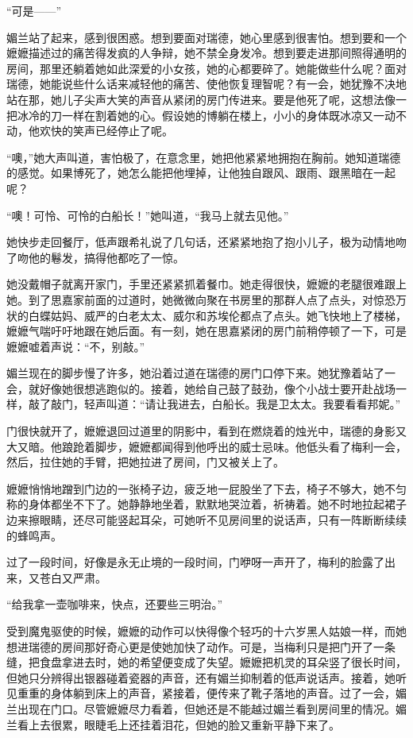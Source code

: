 \par “可是——”
\par 媚兰站了起来，感到很困惑。想到要面对瑞德，她心里感到很害怕。想到要和一个嬷嬷描述过的痛苦得发疯的人争辩，她不禁全身发冷。想到要走进那间照得通明的房间，那里还躺着她如此深爱的小女孩，她的心都要碎了。她能做些什么呢？面对瑞德，她能说些什么话来减轻他的痛苦、使他恢复理智呢？有一会，她犹豫不决地站在那，她儿子尖声大笑的声音从紧闭的房门传进来。要是他死了呢，这想法像一把冰冷的刀一样在割着她的心。假设她的博躺在楼上，小小的身体既冰凉又一动不动，他欢快的笑声已经停止了呢。
\par “噢，”她大声叫道，害怕极了，在意念里，她把他紧紧地拥抱在胸前。她知道瑞德的感觉。如果博死了，她怎么能把他埋掉，让他独自跟风、跟雨、跟黑暗在一起呢？
\par “噢！可怜、可怜的白船长！”她叫道，“我马上就去见他。”
\par 她快步走回餐厅，低声跟希礼说了几句话，还紧紧地抱了抱小儿子，极为动情地吻了吻他的鬈发，搞得他都吃了一惊。
\par 她没戴帽子就离开家门，手里还紧紧抓着餐巾。她走得很快，嬷嬷的老腿很难跟上她。到了思嘉家前面的过道时，她微微向聚在书房里的那群人点了点头，对惊恐万状的白蝶姑妈、威严的白老太太、威尔和苏埃伦都点了点头。她飞快地上了楼梯，嬷嬷气喘吁吁地跟在她后面。有一刻，她在思嘉紧闭的房门前稍停顿了一下，可是嬷嬷嘘着声说：“不，别敲。”
\par 媚兰现在的脚步慢了许多，她沿着过道在瑞德的房门口停下来。她犹豫着站了一会，就好像她很想逃跑似的。接着，她给自己鼓了鼓劲，像个小战士要开赴战场一样，敲了敲门，轻声叫道：“请让我进去，白船长。我是卫太太。我要看看邦妮。”
\par 门很快就开了，嬷嬷退回过道里的阴影中，看到在燃烧着的烛光中，瑞德的身影又大又暗。他踉跄着脚步，嬷嬷都闻得到他呼出的威士忌味。他低头看了梅利一会，然后，拉住她的手臂，把她拉进了房间，门又被关上了。
\par 嬷嬷悄悄地蹭到门边的一张椅子边，疲乏地一屁股坐了下去，椅子不够大，她不匀称的身体都坐不下了。她静静地坐着，默默地哭泣着，祈祷着。她不时地拉起裙子边来擦眼睛，还尽可能竖起耳朵，可她听不见房间里的说话声，只有一阵断断续续的蜂鸣声。
\par 过了一段时间，好像是永无止境的一段时间，门咿呀一声开了，梅利的脸露了出来，又苍白又严肃。
\par “给我拿一壶咖啡来，快点，还要些三明治。”
\par 受到魔鬼驱使的时候，嬷嬷的动作可以快得像个轻巧的十六岁黑人姑娘一样，而她想进瑞德的房间那好奇心更是使她加快了动作。可是，当梅利只是把门开了一条缝，把食盘拿进去时，她的希望便变成了失望。嬷嬷把机灵的耳朵竖了很长时间，但她只分辨得出银器碰着瓷器的声音，还有媚兰抑制着的低声说话声。接着，她听见重重的身体躺到床上的声音，紧接着，便传来了靴子落地的声音。过了一会，媚兰出现在门口。尽管嬷嬷尽力看着，但她还是不能越过媚兰看到房间里的情况。媚兰看上去很累，眼睫毛上还挂着泪花，但她的脸又重新平静下来了。
